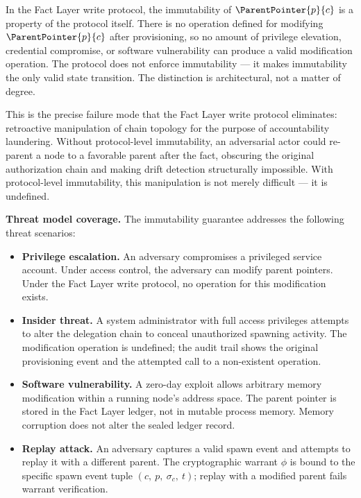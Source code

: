 In the Fact Layer write protocol, the immutability of $\ParentPointer{p}{c}$ is a property of the protocol itself. There is no operation defined for modifying $\ParentPointer{p}{c}$ after provisioning, so no amount of privilege elevation, credential compromise, or software vulnerability can produce a valid modification operation. The protocol does not enforce immutability — it makes immutability the only valid state transition. The distinction is architectural, not a matter of degree.

This is the precise failure mode that the Fact Layer write protocol eliminates: retroactive manipulation of chain topology for the purpose of accountability laundering. Without protocol-level immutability, an adversarial actor could re-parent a node to a favorable parent after the fact, obscuring the original authorization chain and making drift detection structurally impossible. With protocol-level immutability, this manipulation is not merely difficult — it is undefined.

\medskip
\noindent\textbf{Threat model coverage.} The immutability guarantee addresses the following threat scenarios:

\begin{itemize}
    \item \textbf{Privilege escalation.} An adversary compromises a privileged service account. Under access control, the adversary can modify parent pointers. Under the Fact Layer write protocol, no operation for this modification exists.

    \item \textbf{Insider threat.} A system administrator with full access privileges attempts to alter the delegation chain to conceal unauthorized spawning activity. The modification operation is undefined; the audit trail shows the original provisioning event and the attempted call to a non-existent operation.

    \item \textbf{Software vulnerability.} A zero-day exploit allows arbitrary memory modification within a running node's address space. The parent pointer is stored in the Fact Layer ledger, not in mutable process memory. Memory corruption does not alter the sealed ledger record.

    \item \textbf{Replay attack.} An adversary captures a valid spawn event and attempts to replay it with a different parent. The cryptographic warrant $\phi$ is bound to the specific spawn event tuple $(c,\ p,\ \sigma_c,\ t)$; replay with a modified parent fails warrant verification.
\end{itemize}


